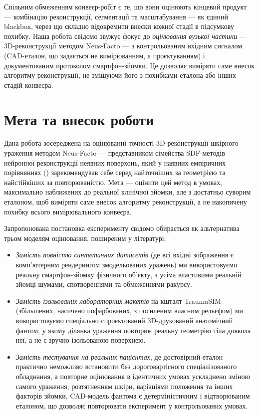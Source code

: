 \documentclass[
  ukrainian,
  10pt,
  a4paper,
  twocolumn]{article}
\providecommand{\tightlist}{%
  \setlength{\itemsep}{0pt}\setlength{\parskip}{0pt}}
\begin{document}
Спільним обмеженням конвеєр-робіт є те, що вони оцінюють кінцевий
продукт --- комбінацію реконструкції, сегментації та масштабування ---
як єдиний blackbox, через що складно відокремити внески кожної стадії в
підсумкову похибку. Наша робота свідомо звужує фокус до \emph{оцінювання
вузької частини} --- 3D-реконструкції методом Neus-Facto --- з
контрольованим вхідним сигналом (CAD-еталон, що задається не
вимірюванням, а проєктуванням) і документованим протоколом
смартфон-зйомки. Це дозволяє виміряти саме внесок алгоритму
реконструкції, не змішуючи його з похибками еталона або інших стадій
конвеєра.

\section{Мета та внесок
роботи}\label{ux43cux435ux442ux430-ux442ux430-ux432ux43dux435ux441ux43eux43a-ux440ux43eux431ux43eux442ux438}

Дана робота зосереджена на оцінюванні точності 3D-реконструкції шкірного
ураження методом Neus-Facto --- представником сімейства SDF-методів
нейронної реконструкції неявних поверхонь, який у наявних емпіричних
порівняннях () зарекомендував себе серед найточніших за геометрією та
найстійкіших за повторюваністю. Мета --- оцінити цей метод в умовах,
максимально наближених до реальної клінічної зйомки, але з достатньо
суворим еталоном, щоб виміряти саме внесок алгоритму реконструкції, а не
накопичену похибку всього вимірювального конвеєра.

Запропонована постановка експерименту свідомо обирається як альтернатива
трьом моделям оцінювання, поширеним у літературі:

\begin{itemize}
\tightlist
\item
  \emph{Замість повністю синтетичних датасетів} (де всі вхідні
  зображення є комп'ютерним рендерингом змодельованих уражень) ми
  використовуємо реальну смартфон-зйомку фізичного об'єкту, з усіма
  властивими реальній зйомці шумами, спотвореннями та обмеженнями
  ракурсу.
\item
  \emph{Замість ізольованих лабораторних макетів} на кшталт TraumaSIM
  (збільшених, насичено пофарбованих, з посиленим власним рельєфом) ми
  використовуємо спеціально спроєктований 3D-друкований анатомічний
  фантом, у якому ділянка ураження повторює реальну геометрію тіла
  довкола неї, а не є зручно ізольованою поверхнею.
\item
  \emph{Замість тестування на реальних пацієнтах}, де достовірний еталон
  практично неможливо встановити без дороговартісного спеціалізованого
  обладнання, а повторне оцінювання в ідентичних умовах ускладнено
  зміною самого ураження, розтягненням шкіри, варіаціями положення та
  інших факторів зйомки, CAD-модель фантома є детерміністичним і
  відтворюваним еталоном, що дозволяє повторювати експеримент у
  контрольованих умовах.
\end{itemize}
\end{document}
